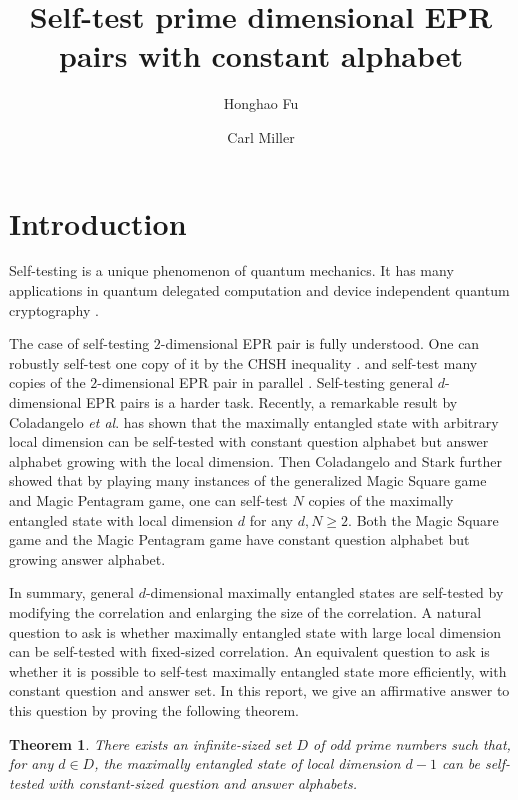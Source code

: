\documentclass[11pt,letterpaper]{article}
\newcommand{\1}{\mathbb{1}}
\newtheorem{theorem}{Theorem}
\theoremstyle{definition}
\begin{document}
\title{Self-test prime dimensional EPR pairs with constant alphabet}

\author[1]{Honghao Fu}
\author[1,2]{Carl Miller}

\renewcommand\Affilfont{\itshape\small}


\maketitle

\section{Introduction}
\label{sec:intro}
Self-testing is a unique phenomenon of quantum mechanics. It has many applications in quantum
delegated computation \cite{ruv2013,cgsv2017} and device independent quantum cryptography
\cite{qkd2011,qkd2014,miller2016,fu2018,eat2018}.

The case of self-testing $2$-dimensional EPR pair is fully understood. One can robustly self-test
one copy of it by the CHSH inequality \cite{bamps2015}. and self-test many copies of the $2$-dimensional EPR
pair in parallel \cite{mckague2016, coladan2017parallel}. 
Self-testing general $d$-dimensional EPR pairs is a harder task.
Recently, a remarkable result by Coladangelo \textit{et al}.\cite{cgs2017} 
has shown that the maximally entangled state with arbitrary local dimension 
can be self-tested with constant question alphabet but answer alphabet growing with
the local dimension. 
Then Coladangelo and Stark \cite{coladan2017} further showed that by playing many instances
of the generalized Magic Square game and Magic Pentagram game, one can self-test
$N$ copies of the maximally entangled state with local dimension $d$ for any $d, N \geq 2$.
Both the Magic Square game and the Magic Pentagram game have constant question alphabet
but growing answer alphabet.

In summary, general $d$-dimensional maximally entangled states are self-tested by
modifying the correlation and enlarging the size of the correlation.
A natural question to ask is whether maximally entangled state with large local dimension
can be self-tested with fixed-sized correlation. 
An equivalent question to ask is whether it is possible to self-test maximally
entangled state more efficiently, with constant question and answer set. 
In this report, we give an affirmative answer to this question by proving the following theorem.
\begin{theorem}
\label{thm:inf}
	There exists an infinite-sized set $D$ of odd prime numbers such that, for any $d \in D$, 
	the maximally entangled state of local dimension $d-1$ can be self-tested 
	with constant-sized question and answer alphabets.
\end{theorem}
\end{document}
